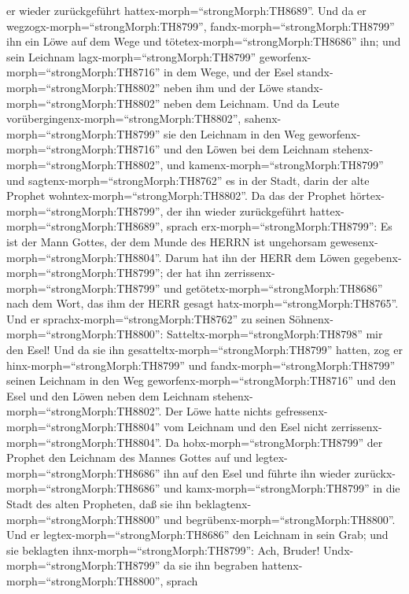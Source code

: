 er wieder zurückgeführt hattex-morph=``strongMorph:TH8689''.
 Und da er wegzogx-morph=``strongMorph:TH8799'',
fandx-morph=``strongMorph:TH8799'' ihn ein Löwe auf dem Wege und
tötetex-morph=``strongMorph:TH8686'' ihn; und sein Leichnam
lagx-morph=``strongMorph:TH8799'' geworfenx-morph=``strongMorph:TH8716''
in dem Wege, und der Esel standx-morph=``strongMorph:TH8802'' neben ihm
und der Löwe standx-morph=``strongMorph:TH8802'' neben dem Leichnam.
 Und da Leute vorübergingenx-morph=``strongMorph:TH8802'',
sahenx-morph=``strongMorph:TH8799'' sie den Leichnam in den Weg
geworfenx-morph=``strongMorph:TH8716'' und den Löwen bei dem Leichnam
stehenx-morph=``strongMorph:TH8802'', und
kamenx-morph=``strongMorph:TH8799'' und
sagtenx-morph=``strongMorph:TH8762'' es in der Stadt, darin der alte
Prophet wohntex-morph=``strongMorph:TH8802''.  Da das der
Prophet hörtex-morph=``strongMorph:TH8799'', der ihn wieder
zurückgeführt hattex-morph=``strongMorph:TH8689'', sprach
erx-morph=``strongMorph:TH8799'': Es ist der Mann Gottes, der dem Munde
des HERRN ist ungehorsam gewesenx-morph=``strongMorph:TH8804''. Darum
hat ihn der HERR dem Löwen gegebenx-morph=``strongMorph:TH8799''; der
hat ihn zerrissenx-morph=``strongMorph:TH8799'' und
getötetx-morph=``strongMorph:TH8686'' nach dem Wort, das ihm der HERR
gesagt hatx-morph=``strongMorph:TH8765''.  Und er
sprachx-morph=``strongMorph:TH8762'' zu seinen
Söhnenx-morph=``strongMorph:TH8800'':
Satteltx-morph=``strongMorph:TH8798'' mir den Esel! Und da sie ihn
gesatteltx-morph=``strongMorph:TH8799'' hatten,  zog er
hinx-morph=``strongMorph:TH8799'' und fandx-morph=``strongMorph:TH8799''
seinen Leichnam in den Weg geworfenx-morph=``strongMorph:TH8716'' und
den Esel und den Löwen neben dem Leichnam
stehenx-morph=``strongMorph:TH8802''. Der Löwe hatte nichts
gefressenx-morph=``strongMorph:TH8804'' vom Leichnam und den Esel nicht
zerrissenx-morph=``strongMorph:TH8804''.  Da
hobx-morph=``strongMorph:TH8799'' der Prophet den Leichnam des Mannes
Gottes auf und legtex-morph=``strongMorph:TH8686'' ihn auf den Esel und
führte ihn wieder zurückx-morph=``strongMorph:TH8686'' und
kamx-morph=``strongMorph:TH8799'' in die Stadt des alten Propheten, daß
sie ihn beklagtenx-morph=``strongMorph:TH8800'' und
begrübenx-morph=``strongMorph:TH8800''.  Und er
legtex-morph=``strongMorph:TH8686'' den Leichnam in sein Grab; und sie
beklagten ihnx-morph=``strongMorph:TH8799'': Ach, Bruder! 
Undx-morph=``strongMorph:TH8799'' da sie ihn begraben
hattenx-morph=``strongMorph:TH8800'', sprach
